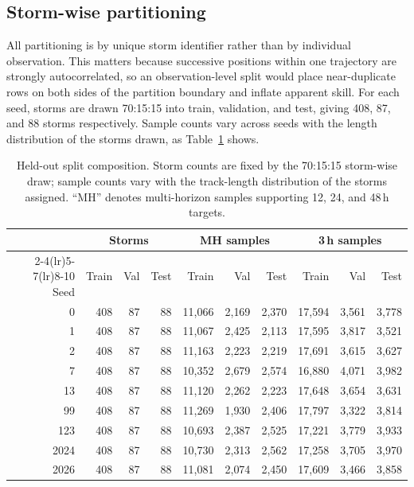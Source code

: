 \documentclass[10pt,twocolumn,a4paper]{article}
\begin{document}
\subsection{Storm-wise partitioning}
All partitioning is by unique storm identifier rather than by individual
observation. This matters because successive positions within one trajectory are
strongly autocorrelated, so an observation-level split would place near-duplicate
rows on both sides of the partition boundary and inflate apparent skill. For each
seed, storms are drawn 70:15:15 into train, validation, and test, giving 408, 87,
and 88 storms respectively. Sample counts vary across seeds with the length
distribution of the storms drawn, as Table~\ref{tab:splits} shows.

\begin{table}[!t]
\caption{Held-out split composition. Storm counts are fixed by the 70:15:15
storm-wise draw; sample counts vary with the track-length distribution of the
storms assigned. ``MH'' denotes multi-horizon samples supporting 12, 24, and
48\,h targets.}
\label{tab:splits}
\centering
\footnotesize
\begin{tabular}{@{}rrrrrrrrrr@{}}
\toprule
& \multicolumn{3}{c}{Storms} & \multicolumn{3}{c}{MH samples}
& \multicolumn{3}{c}{3\,h samples} \\
\cmidrule(lr){2-4}\cmidrule(lr){5-7}\cmidrule(lr){8-10}
Seed & Train & Val & Test & Train & Val & Test & Train & Val & Test \\
\midrule
0    & 408 & 87 & 88 & 11{,}066 & 2{,}169 & 2{,}370 & 17{,}594 & 3{,}561 & 3{,}778 \\
1    & 408 & 87 & 88 & 11{,}067 & 2{,}425 & 2{,}113 & 17{,}595 & 3{,}817 & 3{,}521 \\
2    & 408 & 87 & 88 & 11{,}163 & 2{,}223 & 2{,}219 & 17{,}691 & 3{,}615 & 3{,}627 \\
7    & 408 & 87 & 88 & 10{,}352 & 2{,}679 & 2{,}574 & 16{,}880 & 4{,}071 & 3{,}982 \\
13   & 408 & 87 & 88 & 11{,}120 & 2{,}262 & 2{,}223 & 17{,}648 & 3{,}654 & 3{,}631 \\
99   & 408 & 87 & 88 & 11{,}269 & 1{,}930 & 2{,}406 & 17{,}797 & 3{,}322 & 3{,}814 \\
123  & 408 & 87 & 88 & 10{,}693 & 2{,}387 & 2{,}525 & 17{,}221 & 3{,}779 & 3{,}933 \\
2024 & 408 & 87 & 88 & 10{,}730 & 2{,}313 & 2{,}562 & 17{,}258 & 3{,}705 & 3{,}970 \\
2026 & 408 & 87 & 88 & 11{,}081 & 2{,}074 & 2{,}450 & 17{,}609 & 3{,}466 & 3{,}858 \\
\bottomrule
\end{tabular}
\end{table}
\end{document}
